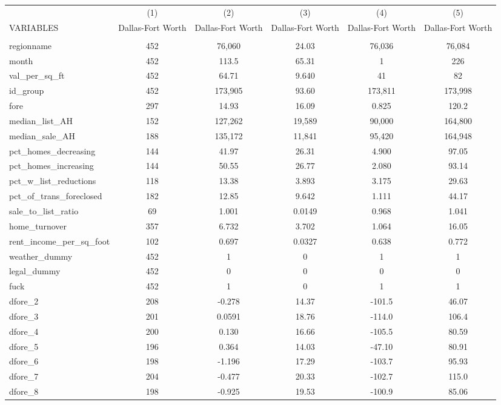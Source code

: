 \begin{tabular}{lccccc} \hline
 & (1) & (2) & (3) & (4) & (5) \\
VARIABLES & Dallas-Fort Worth & Dallas-Fort Worth & Dallas-Fort Worth & Dallas-Fort Worth & Dallas-Fort Worth \\ \hline
 &  &  &  &  &  \\
regionname & 452 & 76,060 & 24.03 & 76,036 & 76,084 \\
month & 452 & 113.5 & 65.31 & 1 & 226 \\
val\_per\_sq\_ft & 452 & 64.71 & 9.640 & 41 & 82 \\
id\_group & 452 & 173,905 & 93.60 & 173,811 & 173,998 \\
fore & 297 & 14.93 & 16.09 & 0.825 & 120.2 \\
median\_list\_AH & 152 & 127,262 & 19,589 & 90,000 & 164,800 \\
median\_sale\_AH & 188 & 135,172 & 11,841 & 95,420 & 164,948 \\
pct\_homes\_decreasing & 144 & 41.97 & 26.31 & 4.900 & 97.05 \\
pct\_homes\_increasing & 144 & 50.55 & 26.77 & 2.080 & 93.14 \\
pct\_w\_list\_reductions & 118 & 13.38 & 3.893 & 3.175 & 29.63 \\
pct\_of\_trans\_foreclosed & 182 & 12.85 & 9.642 & 1.111 & 44.17 \\
sale\_to\_list\_ratio & 69 & 1.001 & 0.0149 & 0.968 & 1.041 \\
home\_turnover & 357 & 6.732 & 3.702 & 1.064 & 16.05 \\
rent\_income\_per\_sq\_foot & 102 & 0.697 & 0.0327 & 0.638 & 0.772 \\
weather\_dummy & 452 & 1 & 0 & 1 & 1 \\
legal\_dummy & 452 & 0 & 0 & 0 & 0 \\
fuck & 452 & 1 & 0 & 1 & 1 \\
dfore\_2 & 208 & -0.278 & 14.37 & -101.5 & 46.07 \\
dfore\_3 & 201 & 0.0591 & 18.76 & -114.0 & 106.4 \\
dfore\_4 & 200 & 0.130 & 16.66 & -105.5 & 80.59 \\
dfore\_5 & 196 & 0.364 & 14.03 & -47.10 & 80.91 \\
dfore\_6 & 198 & -1.196 & 17.29 & -103.7 & 95.93 \\
dfore\_7 & 204 & -0.477 & 20.33 & -102.7 & 115.0 \\
dfore\_8 & 198 & -0.925 & 19.53 & -100.9 & 85.06 \\

\end{tabular}
